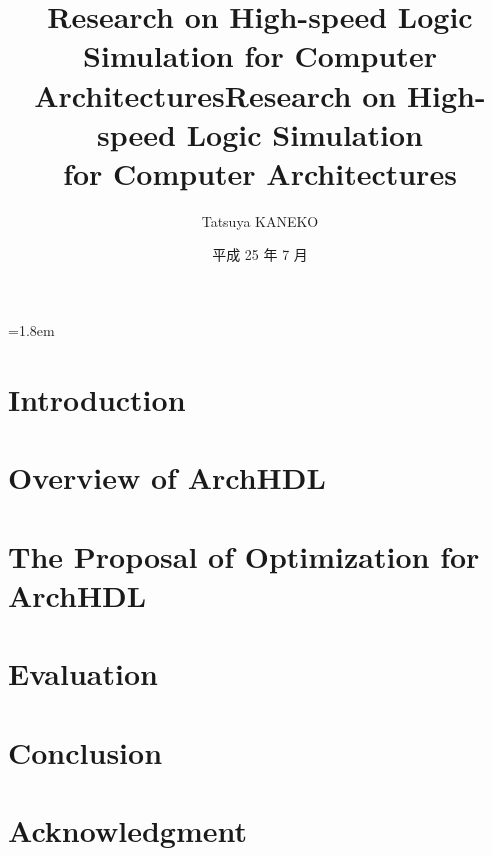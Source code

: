 \documentclass[12pt,openany,papersize,english]{jsbook}
\title{Research on High-speed Logic Simulation for Computer Architectures}
\affiliation{Department of Computer Science}
\title{Research on High-speed Logic Simulation \\ for Computer Architectures}
\author{Tatsuya KANEKO}
\date{平成 25 年 7 月}
\begin{document}
\maketitle
\parindent=1.8em
\frontmatter

\tableofcontents

\mainmatter

\frenchspacing
\sloppy

\chapter{Introduction}




% 

\chapter{Overview of ArchHDL}

\label{c:summary}



\chapter{The Proposal of Optimization for ArchHDL}

\label{c:method}



\chapter{Evaluation}

\label{c:evaluation}



\chapter{Conclusion}

\label{c:conclusion}



\backmatter

\nonfrenchspacing

\chapter{Acknowledgment}

\label{c:acknowledgment}



\label{c:relatedwork}


\end{document}
